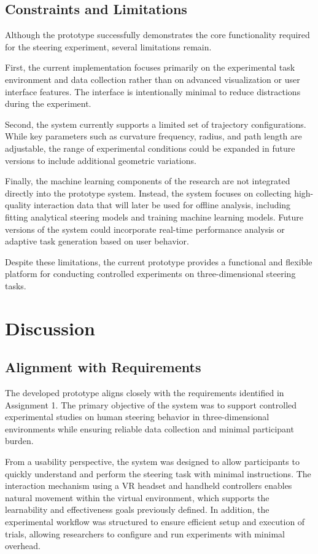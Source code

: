 \documentclass[sigconf]{acmart}
\begin{document}
\subsection{Constraints and Limitations}

Although the prototype successfully demonstrates the core functionality required for the steering experiment, several limitations remain.

First, the current implementation focuses primarily on the experimental task environment and data collection rather than on advanced visualization or user interface features. The interface is intentionally minimal to reduce distractions during the experiment.

Second, the system currently supports a limited set of trajectory configurations. While key parameters such as curvature frequency, radius, and path length are adjustable, the range of experimental conditions could be expanded in future versions to include additional geometric variations.

Finally, the machine learning components of the research are not integrated directly into the prototype system. Instead, the system focuses on collecting high-quality interaction data that will later be used for offline analysis, including fitting analytical steering models and training machine learning models. Future versions of the system could incorporate real-time performance analysis or adaptive task generation based on user behavior.

Despite these limitations, the current prototype provides a functional and flexible platform for conducting controlled experiments on three-dimensional steering tasks.

\section{Discussion}

\subsection{Alignment with Requirements}

The developed prototype aligns closely with the requirements identified in Assignment 1. The primary objective of the system was to support controlled experimental studies on human steering behavior in three-dimensional environments while ensuring reliable data collection and minimal participant burden.

From a usability perspective, the system was designed to allow participants to quickly understand and perform the steering task with minimal instructions. The interaction mechanism using a VR headset and handheld controllers enables natural movement within the virtual environment, which supports the learnability and effectiveness goals previously defined. In addition, the experimental workflow was structured to ensure efficient setup and execution of trials, allowing researchers to configure and run experiments with minimal overhead.
\end{document}
